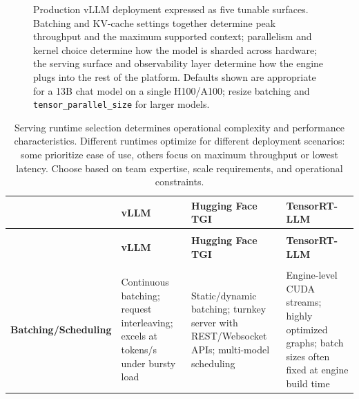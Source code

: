 \begin{figure}[tbp]
\begin{llmfigbox}
\end{llmfigbox}
\caption{Production vLLM deployment expressed as five tunable surfaces. Batching and KV-cache settings together determine peak throughput and the maximum supported context; parallelism and kernel choice determine how the model is sharded across hardware; the serving surface and observability layer determine how the engine plugs into the rest of the platform. Defaults shown are appropriate for a 13B chat model on a single H100/A100; resize batching and \texttt{tensor\_parallel\_size} for larger models.}
\label{fig:ch07_inference_engine_callout}
\end{figure}

{\footnotesize
  \setlength{\tabcolsep}{4pt}
  \renewcommand{\arraystretch}{1.2}
  \begin{xltabular}{\linewidth}{@{}>{\raggedright\arraybackslash}p{3.0cm}>{\raggedright\arraybackslash}X>{\raggedright\arraybackslash}X>{\raggedright\arraybackslash}X@{}}
    \caption{Serving runtime selection determines operational complexity and performance characteristics. Different runtimes optimize for different deployment scenarios: some prioritize ease of use, others focus on maximum throughput or lowest latency. Choose based on team expertise, scale requirements, and operational constraints.}
    \label{tab:ch07_runtimes}\\
    \toprule
    & \textbf{vLLM} \cite{Kwon2023vLLM} & \textbf{Hugging Face TGI} \cite{tgi_docs} & \textbf{TensorRT-LLM} \cite{tensorrt_llm_docs} \\
    \midrule
    \endfirsthead
    \\
    \toprule
    & \textbf{vLLM} & \textbf{Hugging Face TGI} & \textbf{TensorRT-LLM} \\
    \midrule
    \endhead
    \midrule
    \\
    \endfoot
    \bottomrule
    \endlastfoot
    \textbf{Batching/Scheduling} 
    & Continuous batching; request interleaving; excels at tokens/s under bursty load 
    & Static/dynamic batching; turnkey server with REST/Websocket APIs; multi-model scheduling 
    & Engine-level CUDA streams; highly optimized graphs; batch sizes often fixed at engine build time \\

\end{xltabular}}
